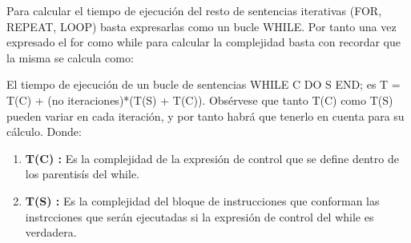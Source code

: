 Para calcular el tiempo de ejecución del resto de sentencias iterativas (FOR,
REPEAT, LOOP) basta expresarlas como un bucle WHILE. Por tanto una vez expresado el for como while para calcular la complejidad basta con recordar que la misma se calcula como:

El tiempo de ejecución de un bucle de sentencias WHILE C DO S END; es T = T(C) + (no iteraciones)*(T(S) + T(C)). Obsérvese que tanto T(C) como T(S)
pueden variar en cada iteración, y por tanto habrá que tenerlo en cuenta para su
cálculo. Donde:

\begin{enumerate}
	\item \textbf{T(C) :} Es la complejidad de la expresión de control que se define dentro de los parentisís del while.
	\item \textbf{T(S) :} Es la complejidad del bloque de instrucciones que conforman las instrcciones que serán ejecutadas si la expresión de control del while es verdadera. 
\end{enumerate}